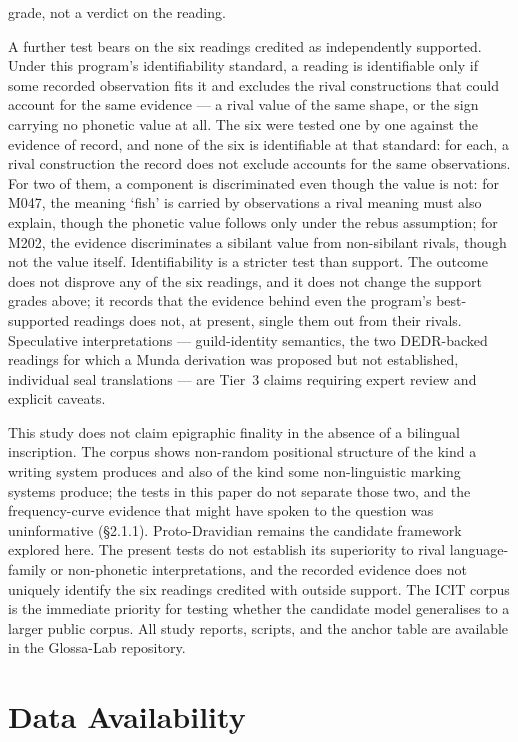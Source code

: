 \documentclass[11pt]{article}
\newcounter{none} %
\begin{document}
grade, not a verdict on the reading.

A further test bears on the six readings credited as independently supported. Under this program's identifiability standard, a reading is identifiable only if some recorded observation fits it and excludes the rival constructions that could account for the same evidence --- a rival value of the same shape, or the sign carrying no phonetic value at all. The six were tested one by one against the evidence of record, and none of the six is identifiable at that standard: for each, a rival construction the record does not exclude accounts for the same observations. For two of them, a component is discriminated even though the value is not: for M047, the meaning `fish' is carried by observations a rival meaning must also explain, though the phonetic value follows only under the rebus assumption; for M202, the evidence discriminates a sibilant value from non-sibilant rivals, though not the value itself. Identifiability is a stricter test than support. The outcome does not disprove any of the six readings, and it does not change the support grades above; it records that the evidence behind even the program's best-supported readings does not, at present, single them out from their rivals.
 Speculative
interpretations --- guild-identity semantics, the two DEDR-backed readings for which a Munda derivation was proposed but not established,
individual seal translations --- are Tier~3 claims requiring expert
review and explicit caveats.

This study does not claim epigraphic finality in the absence of a
bilingual inscription. The corpus shows non-random positional structure of the kind a writing system produces and also of the kind some non-linguistic marking systems produce; the tests in this paper do not separate those two, and the frequency-curve evidence that might have spoken to the question was uninformative (§2.1.1). Proto-Dravidian remains the candidate framework explored here. The present tests do not establish its superiority to rival language-family or non-phonetic interpretations, and the recorded evidence does not uniquely identify the six readings credited with outside support. The ICIT corpus
is the immediate
priority for testing whether the candidate model generalises to a larger public corpus. All study reports, scripts, and the anchor table are available in the Glossa-Lab repository.

\section{Data Availability}\label{data-availability}
\end{document}

